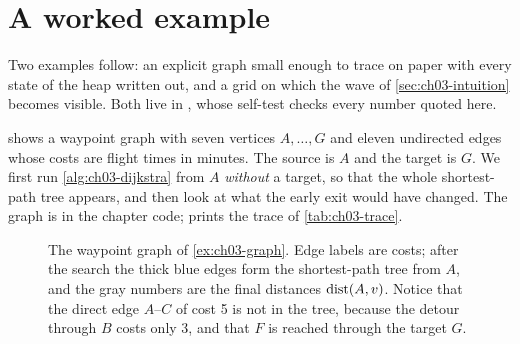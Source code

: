\section{A worked example}
\label{sec:ch03-example}

Two examples follow: an explicit graph small enough to trace on paper with every state of the
heap written out, and a grid on which the wave of \cref{sec:ch03-intuition} becomes visible.
Both live in , whose self-test checks every number quoted here.

\begin{example}
\label{ex:ch03-graph}
 shows a waypoint graph with seven vertices $A,\dots,G$ and eleven
undirected edges whose costs are flight times in minutes. The source is $A$ and the target is
$G$. We first run \cref{alg:ch03-dijkstra} from $A$ \emph{without} a target, so that the whole
shortest-path tree appears, and then look at what the early exit would have changed. The graph
is  in the chapter code;  prints the trace
of \cref{tab:ch03-trace}.
\end{example}

\begin{figure}[tb]
  \centering
  \caption{The waypoint graph of \cref{ex:ch03-graph}. Edge labels are costs; after the search
the thick blue edges form the shortest-path tree from $A$, and the gray numbers are the final
distances $\operatorname{dist}(A,v)$. Notice that the direct edge $A$--$C$ of cost 5 is not in the tree,
because the detour through $B$ costs only 3, and that $F$ is reached through the target $G$.}
  \label{fig:ch03-example-graph}
\end{figure}

